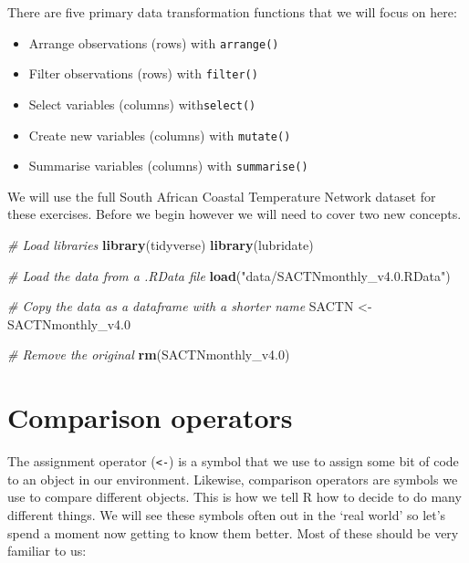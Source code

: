 \documentclass[]{book}
\newenvironment{Shaded}{\begin{snugshade}}{\end{snugshade}}
\newcommand{\KeywordTok}[1]{\textcolor[rgb]{0.13,0.29,0.53}{\textbf{#1}}}
\newcommand{\DecValTok}[1]{\textcolor[rgb]{0.00,0.00,0.81}{#1}}
\newcommand{\StringTok}[1]{\textcolor[rgb]{0.31,0.60,0.02}{#1}}
\newcommand{\CommentTok}[1]{\textcolor[rgb]{0.56,0.35,0.01}{\textit{#1}}}
\newcommand{\NormalTok}[1]{#1}
\providecommand{\tightlist}{%
  \setlength{\itemsep}{0pt}\setlength{\parskip}{0pt}}
\theoremstyle{definition}
\theoremstyle{definition}
\theoremstyle{definition}
\theoremstyle{remark}
\begin{document}
There are five primary data transformation functions that we will focus
on here:

\begin{itemize}
\tightlist
\item
  Arrange observations (rows) with \texttt{arrange()}\\
\item
  Filter observations (rows) with \texttt{filter()}\\
\item
  Select variables (columns) with\texttt{select()}\\
\item
  Create new variables (columns) with \texttt{mutate()}\\
\item
  Summarise variables (columns) with \texttt{summarise()}
\end{itemize}

We will use the full South African Coastal Temperature Network dataset
for these exercises. Before we begin however we will need to cover two
new concepts.

\begin{Shaded}
\begin{Highlighting}[]
\CommentTok{# Load libraries}
\KeywordTok{library}\NormalTok{(tidyverse)}
\KeywordTok{library}\NormalTok{(lubridate)}

\CommentTok{# Load the data from a .RData file}
\KeywordTok{load}\NormalTok{(}\StringTok{"data/SACTNmonthly_v4.0.RData"}\NormalTok{)}

\CommentTok{# Copy the data as a dataframe with a shorter name}
\NormalTok{SACTN <-}\StringTok{ }\NormalTok{SACTNmonthly_v4.}\DecValTok{0}

\CommentTok{# Remove the original}
\KeywordTok{rm}\NormalTok{(SACTNmonthly_v4.}\DecValTok{0}\NormalTok{)}
\end{Highlighting}
\end{Shaded}

\section{Comparison operators}\label{comparison-operators}

The assignment operator (\texttt{\textless{}-}) is a symbol that we use
to assign some bit of code to an object in our environment. Likewise,
comparison operators are symbols we use to compare different objects.
This is how we tell R how to decide to do many different things. We will
see these symbols often out in the `real world' so let's spend a moment
now getting to know them better. Most of these should be very familiar
to us:
\end{document}
